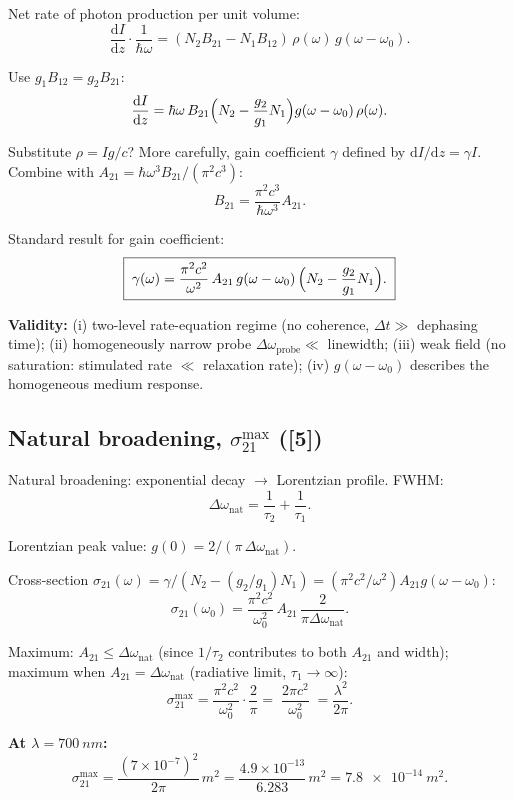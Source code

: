 \documentclass[11pt]{article}
\newcommand{\de}{\mathrm{d}}
\begin{document}
Net rate of photon production per unit volume:
\[
\frac{\de I}{\de z}\cdot\frac{1}{\hbar\omega} = (N_2 B_{21} - N_1 B_{12})\,\rho(\omega)\,g(\omega-\omega_0).
\]

Use $g_1 B_{12} = g_2 B_{21}$:
\[
\frac{\de I}{\de z} = \hbar\omega\,B_{21}\Bigl(N_2 - \frac{g_2}{g_1}N_1\Bigr)g(\omega-\omega_0)\,\rho(\omega).
\]

Substitute $\rho = I g/c$? More carefully, gain coefficient $\gamma$ defined by
$\de I/\de z = \gamma I$. Combine with $A_{21} = \hbar\omega^3 B_{21}/(\pi^2 c^3)$:
\[
B_{21} = \frac{\pi^2 c^3}{\hbar\omega^3}A_{21}.
\]

Standard result for gain coefficient:
\[
\boxed{\;\gamma(\omega) = \frac{\pi^2 c^2}{\omega^2}\,A_{21}\,g(\omega-\omega_0)\,\Bigl(N_2 - \frac{g_2}{g_1}N_1\Bigr).\;}
\]

\textbf{Validity:} (i) two-level rate-equation regime (no coherence, $\Delta t\gg$ dephasing time); (ii) homogeneously narrow probe $\Delta\omega_{\text{probe}}\ll$ linewidth; (iii) weak field (no saturation: stimulated rate $\ll$ relaxation rate); (iv) $g(\omega-\omega_0)$ describes the homogeneous medium response.

\subsection*{Natural broadening, $\sigma_{21}^{\max}$ ([5])}

Natural broadening: exponential decay $\to$ Lorentzian profile. FWHM:
\[
\Delta\omega_{\text{nat}} = \frac{1}{\tau_2} + \frac{1}{\tau_1}.
\]

Lorentzian peak value: $g(0) = 2/(\pi\,\Delta\omega_{\text{nat}})$.

Cross-section $\sigma_{21}(\omega) = \gamma/(N_2 - (g_2/g_1)N_1) = (\pi^2 c^2/\omega^2)A_{21}g(\omega-\omega_0)$:
\[
\sigma_{21}(\omega_0) = \frac{\pi^2 c^2}{\omega_0^2}\,A_{21}\,\frac{2}{\pi\Delta\omega_{\text{nat}}}.
\]

Maximum: $A_{21}\leq \Delta\omega_{\text{nat}}$ (since $1/\tau_2$ contributes to both $A_{21}$ and width); maximum when $A_{21}=\Delta\omega_{\text{nat}}$ (radiative limit, $\tau_1\to\infty$):
\[
\sigma_{21}^{\max} = \frac{\pi^2 c^2}{\omega_0^2}\cdot\frac{2}{\pi} = \boxed{\;\frac{2\pi c^2}{\omega_0^2}\;} = \frac{\lambda^2}{2\pi}.
\]

\textbf{At $\lambda = \SI{700}{nm}$:}
\[
\sigma_{21}^{\max} = \frac{(7\times 10^{-7})^2}{2\pi}\,\si{m^2} = \frac{4.9\times 10^{-13}}{6.283}\,\si{m^2} = \boxed{\SI{7.8e-14}{m^2}}.
\]
\end{document}
